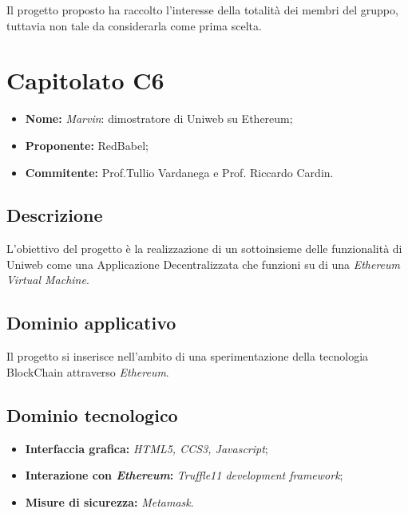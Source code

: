 \documentclass[openany,12pt,a4paper]{report}
\begin{document}
	Il progetto proposto ha raccolto l'interesse della totalità dei membri del gruppo, tuttavia non tale da considerarla come prima scelta.
	
	
	\section{Capitolato C6}
	
	\begin{itemize}
		\item \textbf{Nome:} \textit{Marvin}: dimostratore di Uniweb su Ethereum;
		\item \textbf{Proponente:} RedBabel;
		\item \textbf{Commitente:} Prof.Tullio Vardanega e Prof. Riccardo Cardin.
	\end{itemize}
	
	\subsection{Descrizione}
	
	L'obiettivo del progetto è la realizzazione di un sottoinsieme delle funzionalità di Uniweb come una Applicazione Decentralizzata che funzioni su di una \textit{Ethereum Virtual Machine}.  
	
	\subsection{Dominio applicativo}
	
	Il progetto si inserisce nell'ambito di una sperimentazione della tecnologia BlockChain attraverso \textit{Ethereum}.
	
	\subsection{Dominio tecnologico}
	
	\begin{itemize}
		\item \textbf{Interfaccia grafica:} \textit{HTML5, CCS3, Javascript};
		
		\item \textbf{Interazione con \textit{Ethereum}:} \textit{Truffle11 development framework};
		
		\item \textbf{Misure di sicurezza:} \textit{Metamask}.
	\end{itemize}
	
\end{document}
